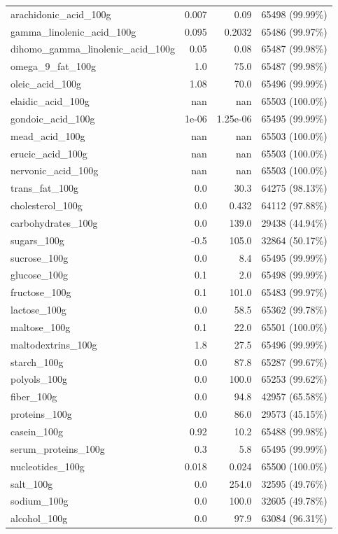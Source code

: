 \documentclass[11pt]{article}
\begin{document}
\begin{center}
\begin{longtable}{|l|r|r|r|}
arachidonic\_acid\_100g& 0.007& 0.09& 65498 (99.99\%)\\
gamma\_linolenic\_acid\_100g& 0.095& 0.2032& 65486 (99.97\%)\\
dihomo\_gamma\_linolenic\_acid\_100g& 0.05& 0.08& 65487 (99.98\%)\\
omega\_9\_fat\_100g& 1.0& 75.0& 65487 (99.98\%)\\
oleic\_acid\_100g& 1.08& 70.0& 65496 (99.99\%)\\
elaidic\_acid\_100g& nan& nan& 65503 (100.0\%)\\
gondoic\_acid\_100g& 1e-06& 1.25e-06& 65495 (99.99\%)\\
mead\_acid\_100g& nan& nan& 65503 (100.0\%)\\
erucic\_acid\_100g& nan& nan& 65503 (100.0\%)\\
nervonic\_acid\_100g& nan& nan& 65503 (100.0\%)\\
trans\_fat\_100g& 0.0& 30.3& 64275 (98.13\%)\\
cholesterol\_100g& 0.0& 0.432& 64112 (97.88\%)\\
carbohydrates\_100g& 0.0& 139.0& 29438 (44.94\%)\\
sugars\_100g& -0.5& 105.0& 32864 (50.17\%)\\
sucrose\_100g& 0.0& 8.4& 65495 (99.99\%)\\
glucose\_100g& 0.1& 2.0& 65498 (99.99\%)\\
fructose\_100g& 0.1& 101.0& 65483 (99.97\%)\\
lactose\_100g& 0.0& 58.5& 65362 (99.78\%)\\
maltose\_100g& 0.1& 22.0& 65501 (100.0\%)\\
maltodextrins\_100g& 1.8& 27.5& 65496 (99.99\%)\\
starch\_100g& 0.0& 87.8& 65287 (99.67\%)\\
polyols\_100g& 0.0& 100.0& 65253 (99.62\%)\\
fiber\_100g& 0.0& 94.8& 42957 (65.58\%)\\
proteins\_100g& 0.0& 86.0& 29573 (45.15\%)\\
casein\_100g& 0.92& 10.2& 65488 (99.98\%)\\
serum\_proteins\_100g& 0.3& 5.8& 65495 (99.99\%)\\
nucleotides\_100g& 0.018& 0.024& 65500 (100.0\%)\\
salt\_100g& 0.0& 254.0& 32595 (49.76\%)\\
sodium\_100g& 0.0& 100.0& 32605 (49.78\%)\\
alcohol\_100g& 0.0& 97.9& 63084 (96.31\%)\\

\end{longtable}
\end{center}
\end{document}
